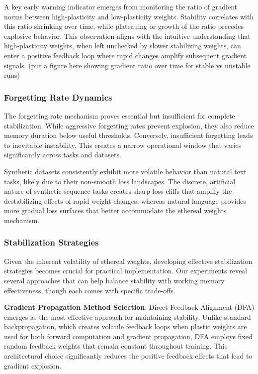 \documentclass{article} %
\begin{document}
A key early warning indicator emerges from monitoring the ratio of gradient norms between high-plasticity and low-plasticity weights. Stability correlates with this ratio shrinking over time, while plateauing or growth of the ratio precedes explosive behavior. This observation aligns with the intuitive understanding that high-plasticity weights, when left unchecked by slower stabilizing weights, can enter a positive feedback loop where rapid changes amplify subsequent gradient signals.
(put a figure here showing gradient ratio over time for stable vs unstable runs)


\subsubsection{Forgetting Rate Dynamics}

The forgetting rate mechanism proves essential but insufficient for complete stabilization. While aggressive forgetting rates prevent explosion, they also reduce memory duration below useful thresholds. Conversely, insufficient forgetting leads to inevitable instability. This creates a narrow operational window that varies significantly across tasks and datasets.

Synthetic datasets consistently exhibit more volatile behavior than natural text tasks, likely due to their non-smooth loss landscapes. The discrete, artificial nature of synthetic sequence tasks creates sharp loss cliffs that amplify the destabilizing effects of rapid weight changes, whereas natural language provides more gradual loss surfaces that better accommodate the ethereal weights mechanism.

\subsubsection{Stabilization Strategies}

Given the inherent volatility of ethereal weights, developing effective stabilization strategies becomes crucial for practical implementation. Our experiments reveal several approaches that can help balance stability with working memory effectiveness, though each comes with specific trade-offs.

\textbf{Gradient Propagation Method Selection}: Direct Feedback Alignment (DFA) emerges as the most effective approach for maintaining stability. Unlike standard backpropagation, which creates volatile feedback loops when plastic weights are used for both forward computation and gradient propagation, DFA employs fixed random feedback weights that remain constant throughout training. This architectural choice significantly reduces the positive feedback effects that lead to gradient explosion.
\end{document}
